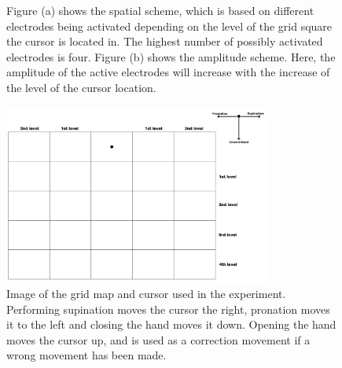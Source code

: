 \begin{figure}
	\caption{Figure (a) shows the spatial scheme, which is based on different electrodes being activated depending on the level of the grid square the cursor is located in. The highest number of possibly activated electrodes is four. Figure (b) shows the amplitude scheme. Here, the amplitude of the active electrodes will increase with the increase of the level of the cursor location.}
	\label{fig:sensconfigs}
\end{figure}

\begin{figure}[H]                 
	\includegraphics[width=0.78\textwidth]{figures/gridmap2}  
	\caption{Image of the grid map and cursor used in the experiment. Performing supination moves the cursor the right, pronation moves it to the left and closing the hand moves it down. Opening the hand moves the cursor up, and is used as a correction movement if a wrong movement has been made.}
	\label{fig:gridmap} 
\end{figure}


